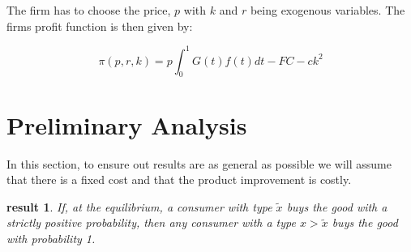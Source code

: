 \documentclass[11pt]{article}
\newtheorem{result}{result}
\begin{document}
The firm has to choose the price,  $p$ with $k$ and $r$ being exogenous variables. The firms profit function is then given by:



\begin{equation} \label{eq:profit1}
\pi(p,r,k)
=p \int^{1}_{0}G(t)f(t)dt -FC-ck^2
\end{equation}

\section{Preliminary Analysis}

In this section, to ensure out results are as general as possible we will assume that there is a fixed cost and that the product improvement is costly. 

\begin{result}
If, at the equilibrium, a consumer with type $\tilde{x}$ buys the good with a strictly positive probability, then any consumer with a type $x>\tilde{x}$ buys the good with probability 1. 
\end{result}
\end{document}
